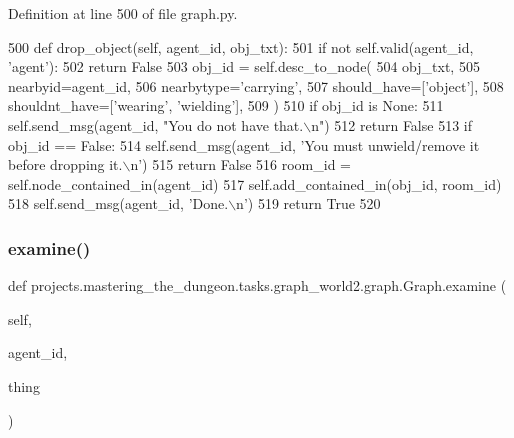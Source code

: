 Definition at line 500 of file graph.\+py.


\begin{DoxyCode}
500     \textcolor{keyword}{def }drop\_object(self, agent\_id, obj\_txt):
501         \textcolor{keywordflow}{if} \textcolor{keywordflow}{not} self.valid(agent\_id, \textcolor{stringliteral}{'agent'}):
502             \textcolor{keywordflow}{return} \textcolor{keyword}{False}
503         obj\_id = self.desc\_to\_node(
504             obj\_txt,
505             nearbyid=agent\_id,
506             nearbytype=\textcolor{stringliteral}{'carrying'},
507             should\_have=[\textcolor{stringliteral}{'object'}],
508             shouldnt\_have=[\textcolor{stringliteral}{'wearing'}, \textcolor{stringliteral}{'wielding'}],
509         )
510         \textcolor{keywordflow}{if} obj\_id \textcolor{keywordflow}{is} \textcolor{keywordtype}{None}:
511             self.send\_msg(agent\_id, \textcolor{stringliteral}{"You do not have that.\(\backslash\)n"})
512             \textcolor{keywordflow}{return} \textcolor{keyword}{False}
513         \textcolor{keywordflow}{if} obj\_id == \textcolor{keyword}{False}:
514             self.send\_msg(agent\_id, \textcolor{stringliteral}{'You must unwield/remove it before dropping it.\(\backslash\)n'})
515             \textcolor{keywordflow}{return} \textcolor{keyword}{False}
516         room\_id = self.node\_contained\_in(agent\_id)
517         self.add\_contained\_in(obj\_id, room\_id)
518         self.send\_msg(agent\_id, \textcolor{stringliteral}{'Done.\(\backslash\)n'})
519         \textcolor{keywordflow}{return} \textcolor{keyword}{True}
520 
\end{DoxyCode}
\mbox{\label{classprojects_1_1mastering__the__dungeon_1_1tasks_1_1graph__world2_1_1graph_1_1Graph_a7976e6ef1b45caf0e61d3d11a1ff6c1d}} 
\subsubsection{\texorpdfstring{examine()}{examine()}}
{\footnotesize\ttfamily def projects.\+mastering\+\_\+the\+\_\+dungeon.\+tasks.\+graph\+\_\+world2.\+graph.\+Graph.\+examine (\begin{DoxyParamCaption}\item[{}]{self,  }\item[{}]{agent\+\_\+id,  }\item[{}]{thing }\end{DoxyParamCaption})}



